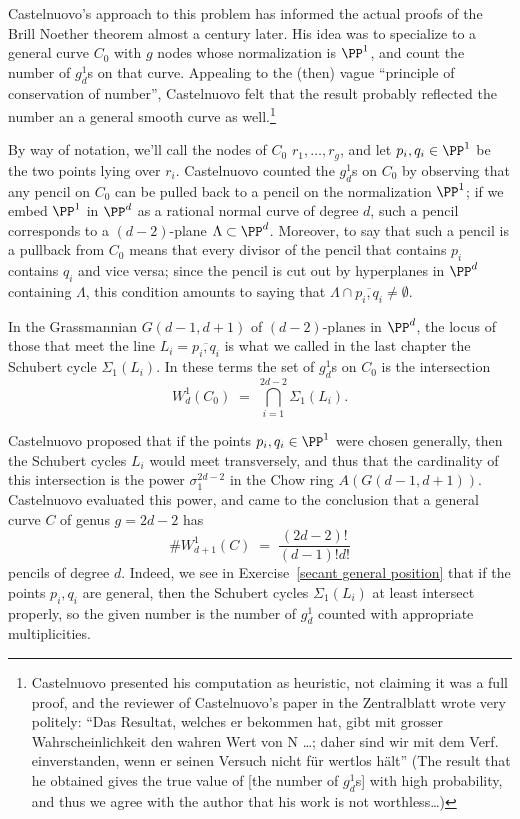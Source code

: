 Castelnuovo's approach to this problem has informed the actual proofs of the Brill Noether theorem almost a century later. His idea was to specialize to a general curve $C_0$ with $g$ nodes  whose normalization is $\PP^1$, and count the number of $g^1_d$s on that curve. Appealing to the (then) vague ``principle of conservation of number'', Castelnuovo felt that the result probably reflected the number an a general smooth curve as well.\footnote{Castelnuovo presented his computation as heuristic, not claiming it was a full proof, and the reviewer of Castelnuovo's paper in the Zentralblatt wrote very politely:
``Das Resultat, welches er bekommen hat, gibt mit grosser Wahrscheinlichkeit den wahren Wert von N \dots; daher sind wir mit dem Verf. einverstanden, wenn er seinen Versuch nicht für wertlos hält''
(The result that he obtained gives the true value of [the number of $g^1_d$s] with high probability, and thus we agree with the author that his work is not worthless\dots)}  

By way of notation, we'll call the nodes of $C_0$ $r_1,\dots,r_g$, and let $p_i, q_i \in \PP^1$ be the two points lying over $r_i$.
Castelnuovo counted the $g^1_d$s on $C_0$ by observing that any pencil on $C_0$ can be pulled back to a pencil on the normalization $\PP^1$; if we embed $\PP^1$ in $\PP^d$ as a rational normal curve of degree $d$, such a pencil corresponds to a $(d-2)$-plane $\Lambda \subset \PP^d$. Moreover, to say that such a pencil is a pullback from $C_0$ means that every divisor of the pencil that contains $p_i$ contains $q_i$ and vice versa; since the pencil is cut out by hyperplanes in $\PP^d$ containing $\Lambda$, this condition amounts to saying that $\Lambda \cap \overline{p_i,q_i} \neq \emptyset$.

In the Grassmannian $G(d-1, d+1)$ of $(d-2)$-planes in $\PP^d$, the locus of those that meet the line $L_i = \overline{p_i,q_i}$ is what we called in the last chapter the Schubert cycle $\Sigma_1(L_i)$. In these terms the set of $g^1_d$s on $C_0$ is the intersection
$$
W^1_d(C_0) \; = \; \bigcap_{i=1}^{2d-2} \Sigma_1(L_i).
$$

Castelnuovo proposed that if the points $p_i, q_i\in \PP^1$ were chosen generally, then the Schubert cycles
$L_i$ would meet transversely, and thus that the cardinality of this intersection is the power $\sigma_1^{2d-2}$ in the Chow ring $A(G(d-1, d+1))$. Castelnuovo evaluated this power, and came to the conclusion that a general curve $C$ of genus $g=2d-2$ has 
$$
\#W^1_{d+1}(C) \; = \; \frac{(2d-2)!}{(d-1)!d!}
$$
pencils of degree $d$. Indeed, we see
 in Exercise~\ref{secant general position} that if the points $p_i, q_i$ are general, then the Schubert cycles $\Sigma_1(L_i)$ at least intersect properly, so the given number is the number of $g^1_d$ counted with appropriate multiplicities.

